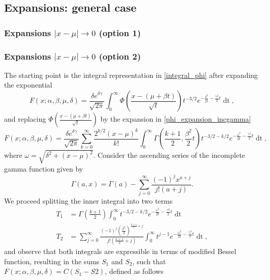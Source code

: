 \documentclass[10pt,a4paper,oneside]{article}
\numberwithin{equation}{section}
\begin{document}
\subsection{Expansions: general case}
\subsubsection{Expansions $|x-\mu| \to 0$ (option 1)}

\subsubsection{Expansions $|x-\mu| \to 0$ (option 2)}
The starting point is the integral representation in \eqref{integral_phi} after expanding the exponential
\begin{equation*}
F(x;\alpha, \beta, \mu, \delta) = \frac{\delta e^{\delta \gamma}}{\sqrt{2\pi}} \int_{0}^{\infty} \Phi\left(\frac{x - (\mu +\beta t)}{\sqrt{t}}\right) t^{-3/2} e^{-\frac{\delta^2}{2t} - \frac{\gamma^2}{2}t} \mathop{dt},
\end{equation*}
and replacing $\Phi\left(\frac{x - (\mu +\beta t)}{\sqrt{t}}\right)$ by the expansion in \eqref{phi_expansion_incgamma}
\begin{equation*}
F(x;\alpha, \beta, \mu, \delta) = \frac{\delta e^{\delta \gamma}}{\sqrt{2\pi}} \sum_{k=0}^{\infty}\frac{2^{k/2}(x-\mu)^k}{k!}\int_0^{\infty}\Gamma\left(\frac{k+1}{2}, \frac{\beta^2}{2}t\right) t^{-3/2-k/2} e^{-\frac{\omega^2}{2t} - \frac{\gamma^2}{2}t} \mathop{dt},
\end{equation*}
where $\omega = \sqrt{\delta^2 + (x-\mu)^2}$. Consider the ascending series of the incomplete gamma function given by \cite[\S 8.7]{NIST:DLMF}
\begin{equation}
\Gamma(a, x) = \Gamma(a) - \sum_{j=0}^{\infty} \frac{(-1)^j x^{a+j}}{j! (a+ j)}.
\end{equation}
We proceed splitting the inner integral into two terms
\begin{align}
T_1 &= \Gamma\left(\frac{k+1}{2}\right)\int_0^{\infty}t^{-3/2-k/2} e^{-\frac{\omega^2}{2t} - \frac{\gamma^2}{2}t} \mathop{dt}\\
T_2 &= \sum_{j=0}^{\infty} \frac{(-1)^j \left(\frac{\beta^2}{2}\right)^{\frac{k+1}{2}+j}}{j! (\frac{k+1}{2}+ j)}\int_0^{\infty} t^{j-1} e^{-\frac{\omega^2}{2t} - \frac{\gamma^2}{2}t} \mathop{dt},
\end{align}
and observe that both integrals are expressible in terms of modified Bessel function, resulting in the sums $S_1$ and $S_2$, such that $F(x;\alpha, \beta, \mu, \delta) = C (S_1 - S2)$, defined as follows
\end{document}
